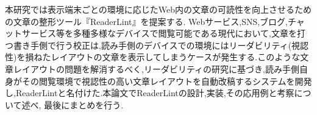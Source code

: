 \begin{jabstract}
    本研究では表示端末ごとの環境に応じたWeb内の文章の可読性を向上させるための文章の整形ツール『ReaderLint』を提案する. Webサービス,SNS,ブログ,チャットサービス等を多種多様なデバイスで閲覧可能である現代において,文章を打つ書き手側で行う校正は,読み手側のデバイスでの環境にはリーダビリティ(視認性)を損ねたレイアウトの文章を表示してしまうケースが発生する.このような文章レイアウトの問題を解消するべく,リーダビリティの研究に基づき,読み手側自身がその閲覧環境で視認性の高い文章レイアウトを自動改稿するシステムを開発し,ReaderLintと名付けた.本論文でReaderLintの設計,実装,その応用例と考察について述べ, 最後にまとめを行う.
\end{jabstract}


